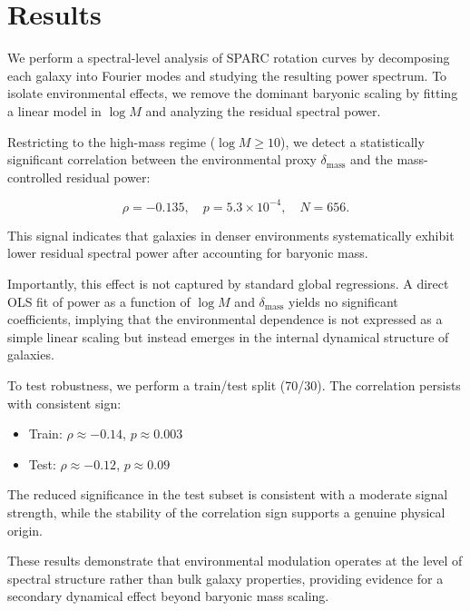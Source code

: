 
\section{Results}

We perform a spectral-level analysis of SPARC rotation curves by decomposing each galaxy into Fourier modes and studying the resulting power spectrum. To isolate environmental effects, we remove the dominant baryonic scaling by fitting a linear model in $\log M$ and analyzing the residual spectral power.

Restricting to the high-mass regime ($\log M \geq 10$), we detect a statistically significant correlation between the environmental proxy $\delta_{\mathrm{mass}}$ and the mass-controlled residual power:

\begin{equation}
\rho = -0.135,\quad p = 5.3 \times 10^{-4},\quad N = 656.
\end{equation}

This signal indicates that galaxies in denser environments systematically exhibit lower residual spectral power after accounting for baryonic mass.

Importantly, this effect is not captured by standard global regressions. A direct OLS fit of power as a function of $\log M$ and $\delta_{\mathrm{mass}}$ yields no significant coefficients, implying that the environmental dependence is not expressed as a simple linear scaling but instead emerges in the internal dynamical structure of galaxies.

To test robustness, we perform a train/test split (70/30). The correlation persists with consistent sign:

\begin{itemize}
\item Train: $\rho \approx -0.14$, $p \approx 0.003$
\item Test: $\rho \approx -0.12$, $p \approx 0.09$
\end{itemize}

The reduced significance in the test subset is consistent with a moderate signal strength, while the stability of the correlation sign supports a genuine physical origin.

These results demonstrate that environmental modulation operates at the level of spectral structure rather than bulk galaxy properties, providing evidence for a secondary dynamical effect beyond baryonic mass scaling.

